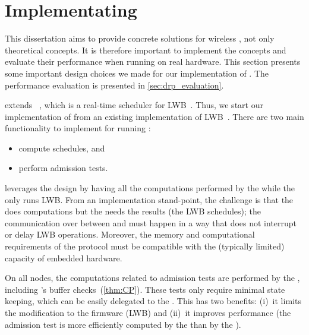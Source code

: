 
\section{Implementating \DRP}
\label{sec:drp_implementation}

This dissertation aims to provide concrete solutions for wireless \CPS, not only theoretical concepts. It is therefore important to implement the concepts and evaluate their performance when running on real hardware.
This section presents some important design choices we made for our implementation of \DRP.
%
The performance evaluation is presented in \cref{sec:drp_evaluation}.




\DRP extends \blink~\cite{zimmerling2017Blink}, which is a real-time scheduler for LWB~\cite{ferrari2012LWB}. Thus, we start our implementation of \DRP from an existing implementation of LWB~\cite{Code_LWB}. There are two main functionality to implement for running \DRP:
\begin{itemize}
  \item
compute \blink schedules, and
  \item
perform \DRP admission tests.
\end{itemize}

\DRP leverages the \DPP design by having all the computations performed by the \AP while the \CP only runs LWB.
From an implementation stand-point, the challenge is that the \AP does computations but the \CP needs the results (\eg the LWB schedules); the communication over \bolt between \AP and \CP  must happen in a way that does not interrupt or delay LWB operations.
Moreover, the memory and computational requirements of the protocol must be compatible with the (typically limited) capacity of embedded hardware.

On all nodes, the computations related to \DRP admission tests are performed by the \AP, including \CP's buffer checks~(\cref{thm:CP}).
These tests only require minimal state keeping, which can be easily delegated to the \AP. This has two benefits: (i)~it limits the modification to the \CP firmware (\ie LWB) and (ii)~it improves performance (the admission test is more efficiently computed by the \AP than by the \CP).

